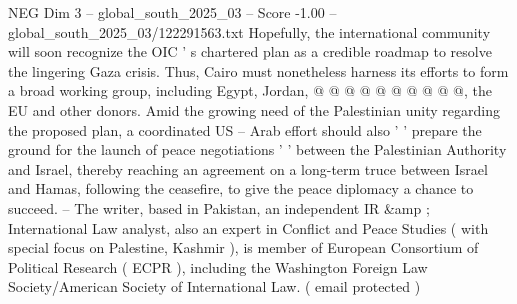 \begin{textsample}{NEG Dim 3 – global\_south\_2025\_03 – Score -1.00 – global\_south\_2025\_03/122291563.txt}
Hopefully, the international community will soon recognize the OIC ' s chartered plan as a credible roadmap to resolve the lingering Gaza crisis.
Thus, Cairo must nonetheless harness its efforts to form a broad working group, including Egypt, Jordan, @ @ @ @ @ @ @ @ @ @, the EU and other donors.
Amid the growing need of the Palestinian unity regarding the proposed plan, a coordinated US -- Arab effort should also ' ' prepare the ground for the launch of peace negotiations ' ' between the Palestinian Authority and Israel, thereby reaching an agreement on a long-term truce between Israel and Hamas, following the ceasefire, to give the peace diplomacy a chance to succeed. -- The writer, based in Pakistan, an independent IR \&amp ; International Law analyst, also an expert in Conflict and Peace Studies ( with special focus on Palestine, Kashmir ), is member of European Consortium of Political Research ( ECPR ), including the Washington Foreign Law Society/American Society of International Law. ( email protected )

\end{textsample}
